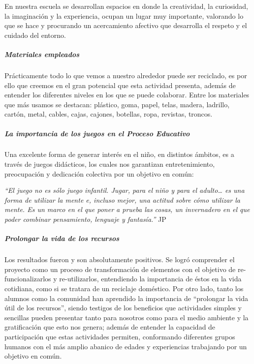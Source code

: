 \documentclass[
]{article}
\begin{document}
En nuestra escuela se desarrollan espacios en donde la creatividad, la
curiosidad, la imaginación y la experiencia, ocupan un lugar muy
importante, valorando lo que se hace y procurando un acercamiento
afectivo que desarrolla el respeto y el cuidado del entorno.

\hypertarget{materiales-empleados}{%
\subparagraph{Materiales empleados}\label{materiales-empleados}}

Prácticamente todo lo que vemos a nuestro alrededor puede ser reciclado,
es por ello que creemos en el gran potencial que esta actividad
presenta, además de entender los diferentes niveles en los que se puede
colaborar. Entre los materiales que más usamos se destacan: plástico,
goma, papel, telas, madera, ladrillo, cartón, metal, cables, cajas,
cajones, botellas, ropa, revistas, troncos.

\hypertarget{la-importancia-de-los-juegos-en-el-proceso-educativo}{%
\subparagraph{La importancia de los juegos en el Proceso
Educativo}\label{la-importancia-de-los-juegos-en-el-proceso-educativo}}

Una excelente forma de generar interés en el niño, en distintos ámbitos,
es a través de juegos didácticos, los cuales nos garantizan
entretenimiento, preocupación y dedicación colectiva por un objetivo en
común:

\emph{``El juego no es sólo juego infantil. Jugar, para el niño y para
el adulto\ldots{} es una forma de utilizar la mente e, incluso mejor,
una actitud sobre cómo utilizar la mente. Es un marco en el que poner a
prueba las cosas, un invernadero en el que poder combinar pensamiento,
lenguaje y fantasía.''} JP

\hypertarget{prolongar-la-vida-de-los-recursos}{%
\subparagraph{Prolongar la vida de los
recursos}\label{prolongar-la-vida-de-los-recursos}}

Los resultados fueron y son absolutamente positivos. Se logró comprender
el proyecto como un proceso de transformación de elementos con el
objetivo de re-funcionalizarlos y re-utilizarlos, entendiendo la
importancia de éstos en la vida cotidiana, como si se tratara de un
reciclaje doméstico. Por otro lado, tanto los alumnos como la comunidad
han aprendido la importancia de ``prolongar la vida útil de los
recursos'', siendo testigos de los beneficios que actividades simples y
sencillas pueden presentar tanto para nosotros como para el medio
ambiente y la gratificación que esto nos genera; además de entender la
capacidad de participación que estas actividades permiten, conformando
diferentes grupos humanos con el más amplio abanico de edades y
experiencias trabajando por un objetivo en común.
\end{document}
